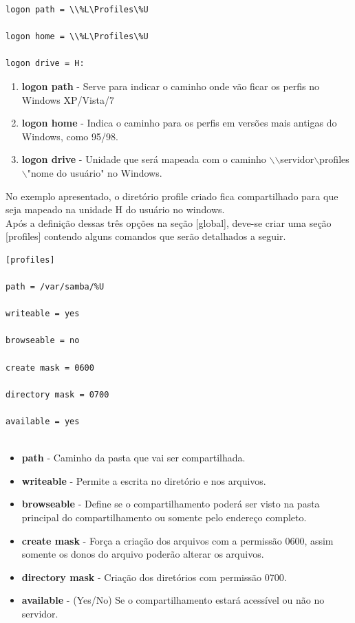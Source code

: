\begin{lstlisting}	
logon path = \\%L\Profiles\%U

logon home = \\%L\Profiles\%U

logon drive = H:	
\end{lstlisting}


\begin{enumerate}
	\item \textbf{logon path} - Serve para indicar o caminho onde vão ficar os perfis no Windows XP/Vista/7 
	\item \textbf{logon home} - Indica o caminho para os perfis em versões mais antigas do Windows, como 95/98.
	\item \textbf{logon drive} -  Unidade que será mapeada com o caminho $\backslash$$\backslash$servidor$\backslash$profiles$\backslash$"nome do usuário" no Windows.
\end{enumerate}

No exemplo apresentado, o diretório profile criado fica compartilhado para que seja mapeado na unidade H do usuário no windows.\\

Após a definição dessas três opções na seção [global], deve-se criar uma seção [profiles] contendo alguns comandos que serão detalhados a seguir.\\

\begin{lstlisting}	
[profiles] 

path = /var/samba/%U 
	
writeable = yes 
	
browseable = no 
	
create mask = 0600 
	
directory mask = 0700 
	
available = yes
	
\end{lstlisting}

\begin{itemize}
	\item \textbf {path} - Caminho da pasta que vai ser compartilhada.
	\item \textbf {writeable} - Permite a escrita no diretório e nos arquivos.
	\item \textbf {browseable} - Define se o compartilhamento poderá ser visto na pasta principal do compartilhamento ou somente pelo endereço completo.
	\item \textbf {create mask} - Força a criação dos arquivos com a permissão 0600, assim somente os donos do arquivo poderão alterar os arquivos.
	\item \textbf {directory mask} - Criação dos diretórios com permissão 0700.
	\item \textbf{available} - (Yes/No) Se o compartilhamento estará acessível ou não no servidor.
\end{itemize}

